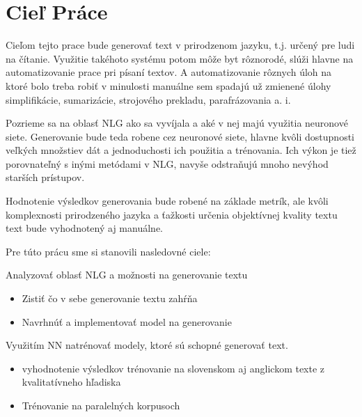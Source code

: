 \section{Cieľ Práce}
Cieľom tejto prace bude generovať text v prirodzenom jazyku, t.j. určený pre ludi na čítanie. Využitie takéhoto systému potom môže byt rôznorodé, slúži hlavne na automatizovanie prace pri písaní textov. A automatizovanie rôznych úloh na ktoré bolo treba robiť v minulosti manuálne sem spadajú už zmienené úlohy simplifikácie, sumarizácie, strojového prekladu, parafrázovania a. i.

Pozrieme sa na oblasť NLG ako sa vyvíjala a aké v nej majú využitia neuronové siete. Generovanie bude teda robene cez neuronové siete, hlavne kvôli dostupnosti veľkých množstiev dát a jednoduchosti ich použitia a trénovania. Ich výkon je tiež porovnateľný s inými metódami v NLG, navyše odstraňujú mnoho nevýhod starších prístupov.

Hodnotenie výsledkov generovania bude robené na základe metrík, ale kvôli komplexnosti prirodzeného jazyka a ťažkosti určenia objektívnej kvality textu text bude vyhodnotený aj manuálne.

Pre túto prácu sme si stanovili nasledovné ciele:

Analyzovať oblasť NLG a možnosti na generovanie textu
\begin{itemize}
    \item Zistiť čo v sebe generovanie textu zahŕňa
    \item Navrhnúť a implementovať model na generovanie
\end{itemize}

Využitím NN natrénovať modely, ktoré sú schopné generovať text.
\begin{itemize}
    \item vyhodnotenie výsledkov trénovanie na slovenskom aj anglickom texte z kvalitatívneho hľadiska
    \item Trénovanie na paralelných korpusoch
\end{itemize}

